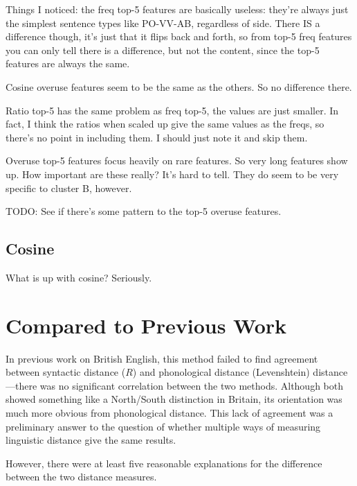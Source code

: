 Things I noticed: the freq top-5 features are basically useless:
they're always just the simplest sentence types like PO-VV-AB,
regardless of side. There IS a difference though, it's just that it
flips back and forth, so from top-5 freq features you can only tell there is
a difference, but not the content, since the top-5 features are always
the same.

Cosine overuse features seem to be the same as the others. So no
difference there.

Ratio top-5 has the same problem as freq top-5, the values are just
smaller. In fact, I think the ratios when scaled up give the same
values as the freqs, so there's no point in including them. I should
just note it and skip them.

Overuse top-5 features focus heavily on rare features. So very long
features show up. How important are these really? It's hard to
tell. They do seem to be very specific to cluster B, however.

TODO: See if there's some pattern to the top-5 overuse features.

\subsection{Cosine}

What is up with cosine? Seriously.

\section{Compared to Previous Work}

In previous work on British English, this method failed to find
agreement between syntactic distance ($R$) and phonological distance
(Levenshtein) distance---there was no
significant correlation between the two methods. Although both showed
something like a North/South distinction in Britain, its orientation was much more
obvious from phonological distance. This lack of agreement was a
preliminary answer to the question of whether multiple
ways of measuring linguistic distance give the same results.

However, there were at least five reasonable explanations for the difference
between the two distance measures.

